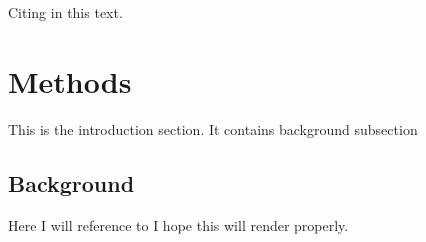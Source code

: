 \documentclass[11pt,a4paper,oneside,openright,titlepage,
  headinclude,footinclude,BCOR=5mm,
  numbers=noenddot,cleardoublepage=empty,
  tablecaptionabove, dottedtoc,
  bibliography=totoc]{scrreprt}
\begin{document}
Citing \citet{rimal2019pred} in this text.

\hypertarget{methods}{%
\chapter{Methods}\label{methods}}

This is the introduction section. It contains background subsection

\hypertarget{background}{%
\section{Background}\label{background}}

Here I will reference to \citep{RIMAL20181} I hope this will render properly.

  



\nocite{*}

\appendix
\end{document}
